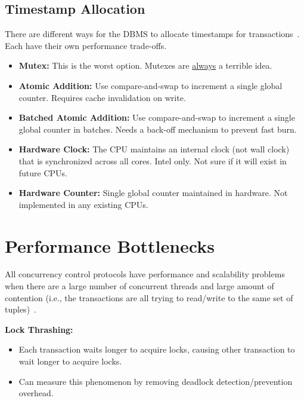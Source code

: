 \documentclass[11pt]{article}
\begin{document}
\subsection*{Timestamp Allocation}
There are different ways for the DBMS to allocate timestamps for transactions~\cite{p209-yu}. Each 
have their own performance trade-offs.
\begin{itemize}
    \item \textbf{Mutex:}
    This is the worst option. Mutexes are \underline{always} a terrible idea.
    
    \item \textbf{Atomic Addition:}
    Use compare-and-swap to increment a single global counter. Requires cache invalidation on write.
    
    \item \textbf{Batched Atomic Addition:}
    Use compare-and-swap to increment a single global counter in batches.
    Needs a back-off mechanism to prevent fast burn.

    \item \textbf{Hardware Clock:}
    The CPU maintains an internal clock (not wall clock) that is synchronized across all cores.
    Intel only. Not sure if it will exist in future CPUs.
    
    \item \textbf{Hardware Counter:}
    Single global counter maintained in hardware. Not implemented in any existing CPUs.
\end{itemize}

\section{Performance Bottlenecks}
All concurrency control protocols have performance and scalability problems when there are a large 
number of concurrent threads and large amount of contention (i.e., the transactions are all trying 
to read/write to the same set of tuples)~\cite{p209-yu}.

\textbf{Lock Thrashing:}
\begin{itemize}
    \item
    Each transaction waits longer to acquire locks, causing other transaction to wait longer to 
    acquire locks.
    
    \item
    Can measure this phenomenon by removing deadlock detection/prevention overhead.
\end{itemize}
    
\end{document}
